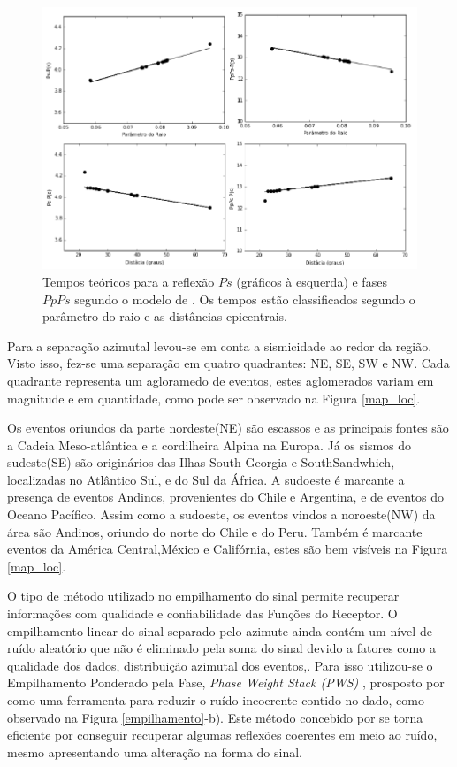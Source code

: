 \begin{figure}[!ht]
\centering
\includegraphics[scale=0.7]{Figs/tempo_teorico_modelo_tauptime.png}
\caption[Tempos teóricos para a reflexão $Ps$ (gráficos à esquerda) e fases $PpPs$ segundo o modelo de \cite{kennet_iaspei_1991}.]{Tempos teóricos para a reflexão $Ps$ (gráficos à esquerda) e fases $PpPs$ segundo o modelo de \cite{kennet_iaspei_1991}. Os tempos estão classificados segundo o parâmetro do raio e as distâncias epicentrais.}
\label{tauptime}
\end{figure}

Para a separação azimutal levou-se em conta a sismicidade ao redor da região. Visto isso, fez-se uma separação em quatro quadrantes: NE, SE, SW e NW. Cada quadrante representa um agloramedo de eventos, estes aglomerados variam em magnitude e em quantidade, como pode ser observado na Figura \ref{map_loc}. 

Os eventos oriundos da parte nordeste(NE) são escassos e as principais fontes são a Cadeia Meso-atlântica e a cordilheira Alpina na Europa. Já os sismos do sudeste(SE) são originários das Ilhas South Georgia e SouthSandwhich, localizadas no Atlântico Sul, e do Sul da África. A sudoeste é marcante a presença de eventos Andinos, provenientes do Chile e Argentina, e de eventos do Oceano Pacífico. Assim como a sudoeste, os eventos vindos a noroeste(NW) da área são Andinos, oriundo do norte do Chile e do Peru. Também é marcante eventos da América Central,México e Califórnia, estes são bem visíveis na Figura \ref{map_loc}.

O tipo de método utilizado no empilhamento do sinal permite recuperar informações com qualidade e confiabilidade das Funções do Receptor. O empilhamento linear do sinal separado pelo azimute ainda contém um nível de ruído aleatório que não é eliminado pela soma do sinal devido a fatores como a qualidade dos dados, distribuição azimutal dos eventos,\cite{schimmel_noise_1997}. Para isso utilizou-se o Empilhamento Ponderado pela Fase, \textit{Phase Weight Stack (PWS)} , prosposto por \cite{schimmel_noise_1997} como uma ferramenta para reduzir o ruído  incoerente contido no dado, como observado na Figura \ref{empilhamento}-b). Este método concebido por \cite{schimmel_noise_1997} se torna eficiente por conseguir recuperar algumas reflexões coerentes em meio ao ruído, mesmo apresentando uma alteração na forma do sinal. 

